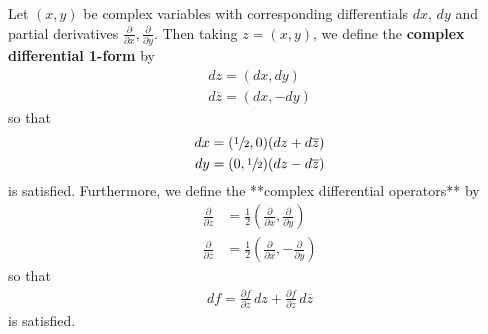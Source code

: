 \documentclass{memoir}
\begin{document}
\begin{defn}
	Let \((x,y)\) be complex variables with corresponding differentials \(dx , \,d y\) and partial derivatives \(\frac{\partial }{\partial x} , \frac{\partial }{\partial y} \). Then taking \(z = (x,y)\), we define the \textbf{complex differential 1-form} by
	\begin{align*}
		dz = (dx, dy)\\
		d \overline{z} = (dx,-dy)
	\end{align*}
	so that
	\begin{align*}
		dx = (\sfrac{1}{2},0) (dz + d \overline{z})\\
		dy = (0, \sfrac{1}{2}) (dz - d \overline{z})
	\end{align*}
	is satisfied. Furthermore, we define the **complex differential operators** by
	\begin{align*}
		\frac{\partial }{\partial z} &= \frac{1}{2}\left( \frac{\partial }{\partial x} , \frac{\partial }{\partial y}  \right)\\
		\frac{\partial }{\partial \overline{z}} &= \frac{1}{2} \left( \frac{\partial }{\partial x} , - \frac{\partial }{\partial y}  \right) 
	\end{align*}
	so that
	\begin{align*}
		df = \frac{\partial f}{\partial z} \,d z + \frac{\partial f}{\partial \overline{z}} \,d \overline{z}
	\end{align*}
	is satisfied.
\end{defn}
\end{document}
